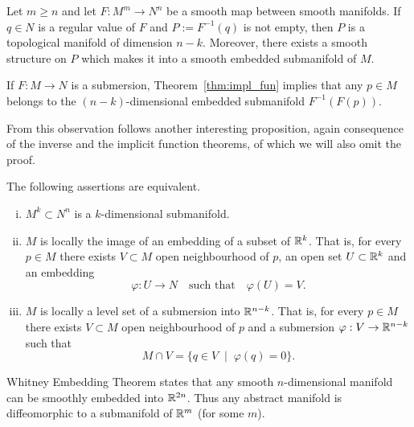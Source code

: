 \begin{theorem}\label{thm:impl_fun}
  Let $m\geq n$ and let $F: M^m \to N^n$ be a smooth map between smooth manifolds.
  If $q\in N$ is a regular value of $F$ and $P := F^{-1}(q)$ is not empty, then $P$ is a topological manifold of dimension $n-k$. 
  Moreover, there exists a smooth structure on $P$ which makes it into a smooth embedded submanifold of $M$.
\end{theorem}

\begin{remark}
  If $F:M\to N$ is a submersion, Theorem~\ref{thm:impl_fun} implies that any $p\in M$ belongs to the $(n-k)$-dimensional embedded submanifold $F^{-1}(F(p))$.
\end{remark}

From this observation follows another interesting proposition, again consequence of the inverse and the implicit function theorems, of which we will also omit the proof.

\begin{proposition}\label{prop:submanifolds_and_R}
  The following assertions are equivalent.
  \begin{enumerate}[(i)]
    \item $M^k\subset N^n$ is a $k$-dimensional submanifold.
    \item $M$ is locally the image of an embedding of a subset of $\mathbb{R}^k$.
    That is, for every $p\in M$ there exists $V\subset M$ open neighbourhood of $p$, an open set $U\subset\mathbb{R}^k$ and an embedding
    \begin{equation}
      \varphi : U \to N \quad\mbox{such that}\quad \varphi(U)=V.
    \end{equation}
    \item $M$ is locally a level set of a submersion into $\mathbb{R}^{n-k}$.
    That is, for every $p\in M$ there exists $V\subset M$ open neighbourhood of $p$ and a submersion $\varphi: V \to\mathbb{R}^{n-k}$ such that
    \begin{equation}
      M\cap V = \{q\in V \;\mid\; \varphi(q) = 0\}.
    \end{equation}
  \end{enumerate}
\end{proposition}

\begin{remark}\label{rmk:WhitneyET}
  Whitney Embedding Theorem states that any smooth $n$-dimensional manifold can be smoothly embedded into $\mathbb{R}^{2n}$.
  Thus any abstract manifold is diffeomorphic to a submanifold of $\mathbb{R}^m$ (for some $m$).
\end{remark}

